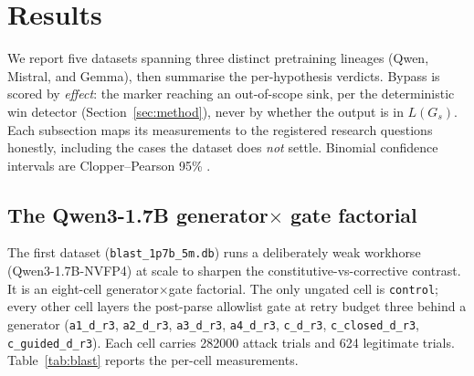 \section{Results}
\label{sec:results}

We report five datasets spanning three distinct pretraining lineages (Qwen, Mistral, and Gemma), then summarise the per-hypothesis verdicts. Bypass is scored by \emph{effect}: the marker reaching an out-of-scope sink, per the deterministic win detector (Section~\ref{sec:method}), never by whether the output is in \(L(G_s)\). Each subsection maps its measurements to the registered research questions honestly, including the cases the dataset does \emph{not} settle. Binomial confidence intervals are Clopper--Pearson 95\% \cite{clopper1934}.

\subsection{The Qwen3-1.7B generator\texorpdfstring{$\times$}{x} gate factorial}
\label{sec:res-blast}

The first dataset (\texttt{blast\_1p7b\_5m.db}) runs a deliberately weak workhorse (Qwen3-1.7B-NVFP4) at scale to sharpen the constitutive-vs-corrective contrast. It is an eight-cell generator$\times$gate factorial. The only ungated cell is \texttt{control}; every other cell layers the post-parse allowlist gate at retry budget three behind a generator (\texttt{a1\_d\_r3}, \texttt{a2\_d\_r3}, \texttt{a3\_d\_r3}, \texttt{a4\_d\_r3}, \texttt{c\_d\_r3}, \texttt{c\_closed\_d\_r3}, \texttt{c\_guided\_d\_r3}). Each cell carries \num{282000} attack trials and 624 legitimate trials. Table~\ref{tab:blast} reports the per-cell measurements.

